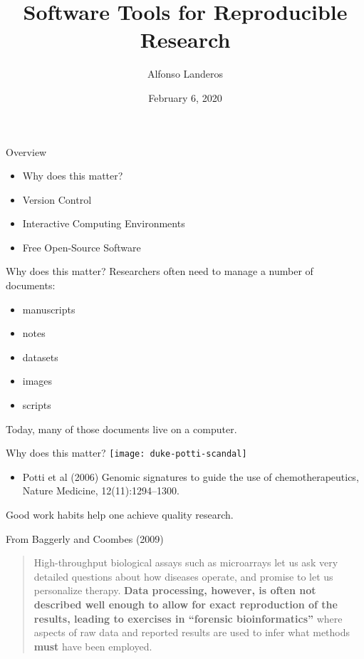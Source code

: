 \documentclass{beamer}
\title{Software Tools for Reproducible Research}
\author{Alfonso Landeros}
\date{February 6, 2020}
\begin{document}
\frame{\titlepage}

\begin{frame}{Overview}
  \begin{itemize}
    \item Why does this matter?

    \item Version Control

    \item Interactive Computing Environments

    \item Free Open-Source Software

  \end{itemize}
\end{frame}



\begin{frame}{Why does this matter?}
  Researchers often need to manage a number of documents: 
  \begin{itemize}
    \item manuscripts

    \item notes

    \item datasets

    \item images

    \item scripts
  \end{itemize}

  Today, many of those documents live on a computer.
\end{frame}

\begin{frame}{Why does this matter?}
  \center
  \texttt{[image: duke-potti-scandal]}

  \begin{itemize}
    \item \tiny Potti et al (2006) Genomic signatures to guide the use of chemotherapeutics, Nature Medicine, 12(11):1294--1300.
  \end{itemize}
  

  Good work habits help one achieve quality research.
\end{frame}

\begin{frame}{From Baggerly and Coombes (2009)}
  \begin{quotation}
    \noindent High-throughput biological assays such as microarrays let us ask very detailed questions about how diseases operate, and promise to let us personalize therapy.
    \textbf{Data processing, however, is often not described well enough to allow for exact reproduction of the results, leading to exercises in “forensic bioinformatics”} where aspects of raw data and reported results are used to infer what methods \textbf{must} have been employed.
  \end{quotation}
\end{frame}
\end{document}
